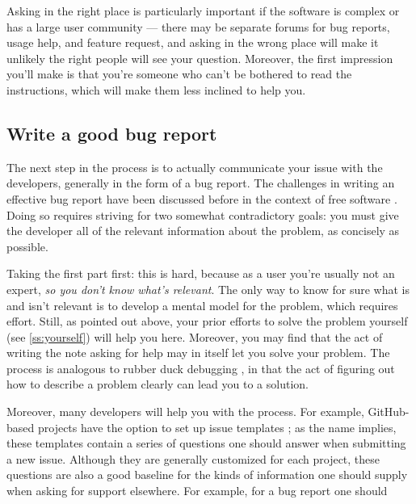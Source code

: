 \documentclass[9pt,training,ASAPversion]{livecoms}
\begin{document}
Asking in the right place is particularly important if the software is complex
or has a large user community --- there may be separate forums for bug reports,
usage help, and feature request, and asking in the wrong place will make it
unlikely the right people will see your question. Moreover, the first impression
you'll make is that you're someone who can't be bothered to read the
instructions, which will make them less inclined to help you.

\subsection{Write a good bug report}

The next step in the process is to actually communicate your issue with the
developers, generally in the form of a bug report.  The challenges in writing an
effective bug report have been discussed before in the context of free software
\cite{Raymond, Tatham}.  Doing so requires striving for two somewhat
contradictory goals: you must give the developer all of the relevant information
about the problem, as concisely as possible.

Taking the first part first: this is hard, because as a user you're usually not
an expert, \emph{so you don't know what's relevant}. The only way to know for
sure what is and isn't relevant is to develop a mental model for the problem,
which requires effort. Still, as pointed out above, your prior efforts to solve
the problem yourself (see \ref{ss:yourself}) will help you here.  Moreover, you
may find that the act of writing the note asking for help may in itself let you
solve your problem. The process is analogous to rubber duck debugging
\cite{Thomas-1999}, in that the act of figuring out how to describe a problem
clearly can lead you to a solution.

Moreover, many developers will help you with the process. For example,
GitHub-based projects have the option to set up issue templates
\cite{github-templates}; as the name implies, these templates contain a series
of questions one should answer when submitting a new issue. Although they are
generally customized for each project, these questions are also a good baseline
for the kinds of information one should supply when asking for support
elsewhere. For example, for a bug report one should
\end{document}
